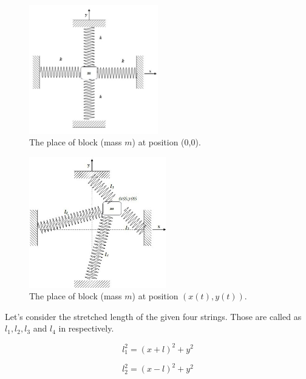 \newpage

\begin{figure}[hbt!]
	\centering
	\begin{framed}
	\includegraphics[width=0.5\textwidth]{Figures/H.jpeg}
	\end{framed}
	\caption{ The place of block (mass $m$) at position (0,0).}
	\label{fig:8}
\end{figure}

\begin{figure}[hbt!]
	\centering
	\begin{framed}
	\includegraphics[width=0.53\textwidth]{Figures/I.jpeg}
	\end{framed}
	\caption{ The place of block (mass $m$) at position $(x(t),y(t))$.}
	\label{fig:9}
\end{figure}

\newpage 

Let's consider the stretched length of the given four strings. Those are called as $l_1,l_2,l_3$ and $l_4$ in respectively. 

\begin{equation}
    \label{s1}
    l^2_1 = (x+l)^2+y^2
\end{equation}

\begin{equation}
    \label{s2}
    l^2_2 = (x-l)^2+y^2
\end{equation}

